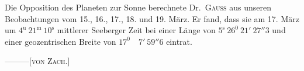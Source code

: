 Die Opposition des Planeten zur Sonne berechnete Dr.\ \textsc{Gauß} aus unseren Beobachtungen vom 15., 16., 17., 18. und 19. März. Er fand, dass sie am 17. März um $4^{\mathrm{u}}\ 21^{\mathrm{m}}\ 10^{\mathrm{s}}$ mittlerer Seeberger Zeit bei einer Länge von $5^{\mathrm{s}}\ 26^0\ 21'\ 27''3$ und einer geozentrischen Breite von $17^0\quad7'\ 59''6$ eintrat.
\par\noindent —\quad —\quad —\hfill [\textsc{von Zach}.]\par

